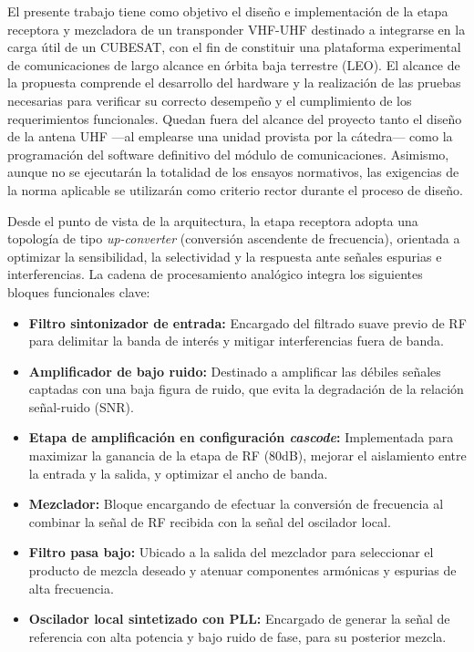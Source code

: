 \documentclass[11pt,a4paper,twoside]{report}
\begin{document}
	El presente trabajo tiene como objetivo el diseño e implementación de la etapa receptora y mezcladora de un transponder VHF-UHF destinado a integrarse en la carga útil de un CUBESAT, con el fin de constituir una plataforma experimental de comunicaciones de largo alcance en órbita baja terrestre (LEO). El alcance de la propuesta comprende el desarrollo del hardware y la realización de las pruebas necesarias para verificar su correcto desempeño y el cumplimiento de los requerimientos funcionales. Quedan fuera del alcance del proyecto tanto el diseño de la antena UHF —al emplearse una unidad provista por la cátedra— como la programación del software definitivo del módulo de comunicaciones. Asimismo, aunque no se ejecutarán la totalidad de los ensayos normativos, las exigencias de la norma aplicable se utilizarán como criterio rector durante el proceso de diseño.
	
	Desde el punto de vista de la arquitectura, la etapa receptora adopta una topología de tipo \textit{up-converter} (conversión ascendente de frecuencia), orientada a optimizar la sensibilidad, la selectividad y la respuesta ante señales espurias e interferencias. La cadena de procesamiento analógico integra los siguientes bloques funcionales clave:
	\begin{itemize}
		\item \textbf{Filtro sintonizador de entrada:} Encargado del filtrado suave previo de RF para delimitar la banda de interés y mitigar interferencias fuera de banda.
		
		\item \textbf{Amplificador de bajo ruido:} Destinado a amplificar las débiles señales captadas con una baja figura de ruido, que evita la degradación de la relación señal-ruido (SNR).
		
		\item \textbf{Etapa de amplificación en configuración \textit{cascode}:} Implementada para maximizar la ganancia de la etapa de RF (80dB), mejorar el aislamiento entre la entrada y la salida, y optimizar el ancho de banda.
		
		\item \textbf{Mezclador:} Bloque encargando de efectuar la conversión de frecuencia al combinar la señal de RF recibida con la señal del oscilador local.
		
		\item \textbf{Filtro pasa bajo:} Ubicado a la salida del mezclador para seleccionar el producto de mezcla deseado y atenuar componentes armónicas y espurias de alta frecuencia.
		
		\item \textbf{Oscilador local sintetizado con PLL:} Encargado de generar la señal de referencia con alta potencia y bajo ruido de fase, para su posterior mezcla.
	\end{itemize}\newpage
	
\end{document}

